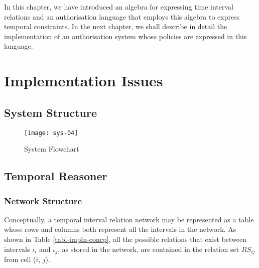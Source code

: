 \documentclass[11pt]{report}
\begin{document}
      In this chapter, we have introduced an algebra for expressing time
      interval relations and an authorisation language that employs this
      algebra to express temporal constraints. In the next chapter, we shall
      describe in detail the implementation of an authorisation system whose
      policies are expressed in this language.

  \chapter{Implementation Issues}
    \label{chap-impln}

    \section{System Structure}
      \label{sect-impln-sysst}

      \begin{figure}[tbhp]
        \begin{center}
          \texttt{[image: sys-04]}
          \caption{System Flowchart}
          \label{figu-impln-flwch}
        \end{center}
      \end{figure}

    \section{Temporal Reasoner}
      \label{sect-impln-treas}

      \subsection{Network Structure}
        \label{subs-impln-struc}

        Conceptually, a temporal interval relation network may be represented
        as a table whose rows and columns both represent all the intervals
        in the network. As shown in Table \ref{tabl-impln-concp}, all the
        possible relations that exist between intervals $\iota_i$ and
        $\iota_j$, as stored in the network, are contained in the relation set
        $RS_{ij}$ from cell ($i$, $j$).
\end{document}
